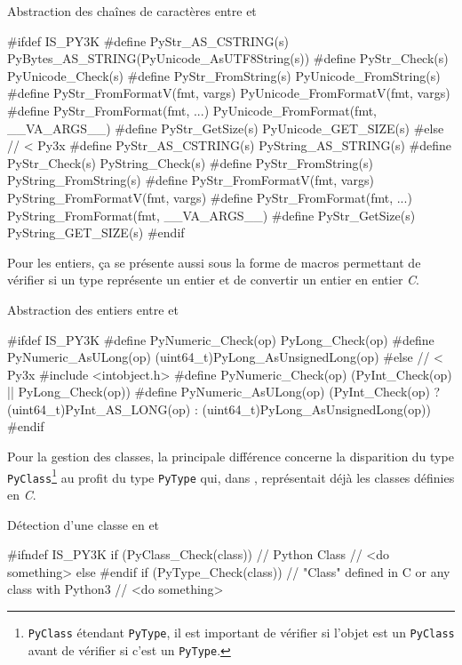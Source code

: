   \begin{listing}[H]
    \caption{Abstraction des chaînes de caractères entre  et }
\begin{ccode}
#ifdef IS_PY3K
#define PyStr_AS_CSTRING(s) PyBytes_AS_STRING(PyUnicode_AsUTF8String(s))
#define PyStr_Check(s) PyUnicode_Check(s)
#define PyStr_FromString(s) PyUnicode_FromString(s)
#define PyStr_FromFormatV(fmt, vargs) PyUnicode_FromFormatV(fmt, vargs)
#define PyStr_FromFormat(fmt, ...) PyUnicode_FromFormat(fmt, __VA_ARGS__)
#define PyStr_GetSize(s) PyUnicode_GET_SIZE(s)
#else // < Py3x
#define PyStr_AS_CSTRING(s) PyString_AS_STRING(s)
#define PyStr_Check(s) PyString_Check(s)
#define PyStr_FromString(s) PyString_FromString(s)
#define PyStr_FromFormatV(fmt, vargs) PyString_FromFormatV(fmt, vargs)
#define PyStr_FromFormat(fmt, ...) PyString_FromFormat(fmt, __VA_ARGS__)
#define PyStr_GetSize(s) PyString_GET_SIZE(s)
#endif
\end{ccode}
  \end{listing}
  
Pour les entiers, ça se présente aussi sous la forme de macros permettant de vérifier si un type \Python représente un entier et de convertir un entier \Python en entier \emph{C}.

  \begin{listing}[H]
    \caption{Abstraction des entiers entre  et }
\begin{ccode}
#ifdef IS_PY3K
#define PyNumeric_Check(op) PyLong_Check(op)
#define PyNumeric_AsULong(op) (uint64_t)PyLong_AsUnsignedLong(op)
#else // < Py3x
#include <intobject.h>
#define PyNumeric_Check(op) (PyInt_Check(op) || PyLong_Check(op))
#define PyNumeric_AsULong(op) (PyInt_Check(op) ? (uint64_t)PyInt_AS_LONG(op) : (uint64_t)PyLong_AsUnsignedLong(op))
#endif
\end{ccode}
  \end{listing} 
  \clearpage
Pour la gestion des classes, la principale différence concerne la disparition du type \verb|PyClass|\footnote{\verb?PyClass? étendant \verb?PyType?, il est important de vérifier si l'objet est un \verb?PyClass? avant de vérifier si c'est un \verb?PyType?.} au profit du type \verb|PyType| qui, dans , représentait déjà les classes définies en \emph{C}.

  \begin{listing}[H]
    \caption{Détection d'une classe en  et }
\begin{ccode}
#ifndef IS_PY3K
if (PyClass_Check(class)) {
	// Python Class
	// <do something>
} else
#endif
if (PyType_Check(class)) {
	// "Class" defined in C or any class with Python3
	// <do something>
}
\end{ccode}
  \end{listing}
  
